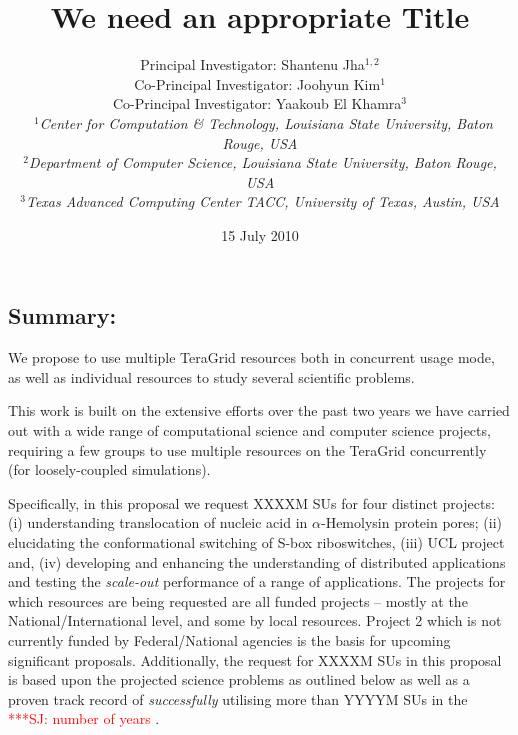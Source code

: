 \documentclass[a4paper,10pt]{article}
\begin{document}
\title{\large %
  We need an appropriate Title}

\author{Principal Investigator: Shantenu Jha$^{1,2}$ \\
Co-Principal Investigator: Joohyun Kim$^{1}$ \\ 
Co-Principal Investigator: Yaakoub El Khamra$^{3}$\\\
   \small{\emph{$^{1}$Center for Computation \& Technology, Louisiana State University, Baton Rouge, 
USA}}
\\
  \small{\emph{$^{2}$Department of Computer Science, Louisiana State
      University, Baton Rouge, USA}}
\\
  \small{\emph{$^{3}$Texas Advanced Computing Center TACC, University of Texas, Austin, USA}}}

\newif\ifdraft
\drafttrue
\ifdraft
\newcommand{\amnote}[1]{ {\textcolor{magenta} { ***AM: #1c }}}
\newcommand{\jhanote}[1]{ {\textcolor{red} { ***SJ: #1 }}}
\newcommand{\michaelnote}[1]{ {\textcolor{blue} { ***MM: #1 }}}
\else
\newcommand{\amnote}[1]{}
\newcommand{\jhanote}[1]{}
\newcommand{\michaelnote}[1]{ {\textcolor{blue} { ***MM: #1 }}}
\fi


\date{15 July 2010}

\maketitle

\subsection*{Summary:} 

We propose to use multiple TeraGrid resources both in concurrent usage mode, as well as individual resources to study several scientific problems.  

This work is built on the extensive efforts over the past two years we have carried out with a wide range of computational science and computer science projects, requiring a few groups to use multiple resources on the TeraGrid concurrently (for loosely-coupled simulations).  

Specifically, in this proposal we request XXXXM SUs for four distinct projects: (i) understanding translocation of nucleic acid in $\alpha$-Hemolysin protein pores; (ii) elucidating the conformational switching of S-box riboswitches, (iii) UCL project and, (iv) developing and enhancing the understanding of distributed applications and testing the {\it scale-out } performance of a range of applications. The projects for which resources are being requested are all funded projects -- mostly at the National/International level, and some by local resources. Project 2 which is not currently funded by Federal/National agencies is the basis for upcoming significant proposals.  Additionally, the request for XXXXM SUs in this proposal is based upon the projected science problems as outlined below as well as a proven track record of {\it successfully} utilising more than YYYYM SUs in the \jhanote{number of years}.
\end{document}
